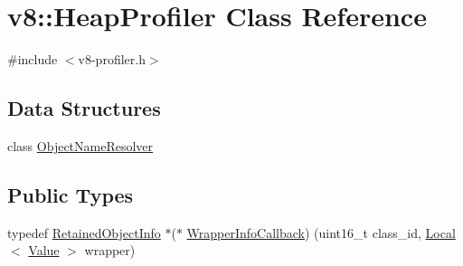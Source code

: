 \hypertarget{classv8_1_1HeapProfiler}{}\section{v8\+:\+:Heap\+Profiler Class Reference}
\label{classv8_1_1HeapProfiler}


{\ttfamily \#include $<$v8-\/profiler.\+h$>$}

\subsection*{Data Structures}
\begin{DoxyCompactItemize}
\item 
class \hyperlink{classv8_1_1HeapProfiler_1_1ObjectNameResolver}{Object\+Name\+Resolver}
\end{DoxyCompactItemize}
\subsection*{Public Types}
\begin{DoxyCompactItemize}
\item 
typedef \hyperlink{classv8_1_1RetainedObjectInfo}{Retained\+Object\+Info} $\ast$($\ast$ \hyperlink{classv8_1_1HeapProfiler_a677025dd201fd832e0464e5ab0b0d0d4}{Wrapper\+Info\+Callback}) (uint16\+\_\+t class\+\_\+id, \hyperlink{classv8_1_1Local}{Local}$<$ \hyperlink{classv8_1_1Value}{Value} $>$ wrapper)
\end{DoxyCompactItemize}
